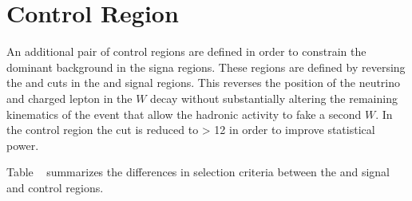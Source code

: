 \section{\wjets Control Region}
An additional pair of control regions are defined in order to constrain the dominant \wjets background in the signa regions. These regions are defined by reversing the \drTARl and \drWl cuts in the \merged and \resolved signal regions. This reverses the position of the neutrino and charged lepton in the $W$ decay without substantially altering the remaining kinematics of the event that allow the hadronic activity to fake a second $W$. In the \merged \wjets control region the \metsig cut is reduced to \metsig > 12 in order to improve statistical power.

Table ~ summarizes the differences in selection criteria between the \merged and \resolved signal and \wjets control regions.

